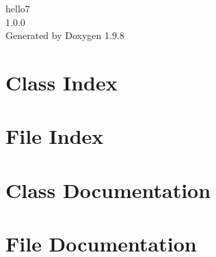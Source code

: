 \documentclass[twoside]{book}
\newcommand{\+}{\discretionary{\mbox{\scriptsize$\hookleftarrow$}}{}{}}
\newcommand{\clearemptydoublepage}{%
    \newpage{\pagestyle{empty}\cleardoublepage}%
  }
\begin{document}
  \raggedbottom
    \hypersetup{pageanchor=false,
                bookmarksnumbered=true,
                pdfencoding=unicode
               }
  \begin{titlepage}
  \vspace*{7cm}
  \begin{center}%
  {\Large hello7}\\
  [1ex]\large 1.\+0.\+0 \\
  \vspace*{1cm}
  {\large Generated by Doxygen 1.9.8}\\
  \end{center}
  \end{titlepage}
  \clearemptydoublepage
  \tableofcontents
  \clearemptydoublepage
  \hypersetup{pageanchor=true}
\chapter{Class Index}

\chapter{File Index}

\chapter{Class Documentation}


\chapter{File Documentation}


























  \backmatter
  \newpage
  \clearemptydoublepage
  \printindex
\end{document}
